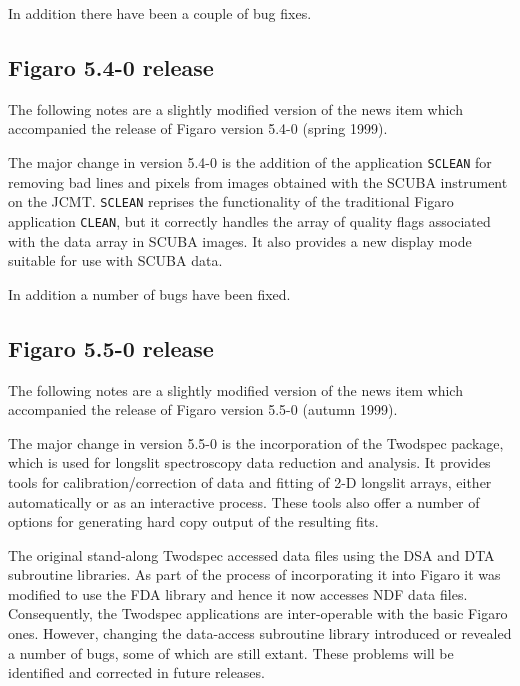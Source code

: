  In addition there have been a couple of bug fixes.


\subsection{\label{news540}Figaro 5.4-0 release}

 The following notes are a slightly modified version of the news item
 which accompanied the release of Figaro version 5.4-0 (spring 1999).

 The major change in version 5.4-0 is the addition of the application
 {\tt SCLEAN} for removing bad lines and pixels from images obtained with the
 SCUBA instrument on the JCMT.  {\tt SCLEAN} reprises the functionality of
 the traditional Figaro application {\tt CLEAN}, but it correctly handles the
 array of quality flags associated with the data array in SCUBA images.
 It also provides a new display mode suitable for use with SCUBA data.

 In addition a number of bugs have been fixed.

\subsection{\label{news550}Figaro 5.5-0 release}

 The following notes are a slightly modified version of the news item
 which accompanied the release of Figaro version 5.5-0 (autumn 1999).

 The major change in version 5.5-0 is the incorporation of the Twodspec 
 package, which is used for 
 longslit spectroscopy data reduction and analysis. It provides tools for
 calibration/correction of data and fitting of 2-D longslit arrays, 
 either automatically or as an interactive process. These tools also 
 offer a number of options for generating hard copy output of the 
 resulting fits.

 The original stand-along Twodspec accessed data files using the DSA and
 DTA subroutine libraries.  As part of the process of incorporating it
 into Figaro it was modified to use the FDA library and hence it now accesses
 NDF data files.  Consequently, the Twodspec applications are inter-operable
 with the basic Figaro ones.  However, changing the data-access subroutine
 library introduced or revealed a number of bugs, some of which are still
 extant.  These problems will be identified and corrected in future releases.

